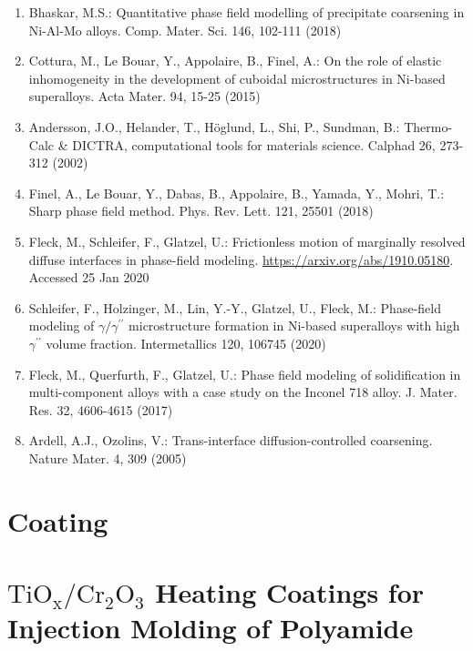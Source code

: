 \documentclass[10pt]{article}
\begin{document}
\begin{enumerate}
  \item Bhaskar, M.S.: Quantitative phase field modelling of precipitate coarsening in Ni-Al-Mo alloys. Comp. Mater. Sci. 146, 102-111 (2018)

  \item Cottura, M., Le Bouar, Y., Appolaire, B., Finel, A.: On the role of elastic inhomogeneity in the development of cuboidal microstructures in Ni-based superalloys. Acta Mater. 94, 15-25 (2015)

  \item Andersson, J.O., Helander, T., Höglund, L., Shi, P., Sundman, B.: Thermo-Calc \& DICTRA, computational tools for materials science. Calphad 26, 273-312 (2002)

  \item Finel, A., Le Bouar, Y., Dabas, B., Appolaire, B., Yamada, Y., Mohri, T.: Sharp phase field method. Phys. Rev. Lett. 121, 25501 (2018)

  \item Fleck, M., Schleifer, F., Glatzel, U.: Frictionless motion of marginally resolved diffuse interfaces in phase-field modeling. \href{https://arxiv.org/abs/1910.05180}{https://arxiv.org/abs/1910.05180}. Accessed 25 Jan 2020

  \item Schleifer, F., Holzinger, M., Lin, Y.-Y., Glatzel, U., Fleck, M.: Phase-field modeling of $\gamma / \gamma^{\prime \prime}$ microstructure formation in Ni-based superalloys with high $\gamma^{\prime \prime}$ volume fraction. Intermetallics 120, 106745 (2020)

  \item Fleck, M., Querfurth, F., Glatzel, U.: Phase field modeling of solidification in multi-component alloys with a case study on the Inconel 718 alloy. J. Mater. Res. 32, 4606-4615 (2017)

  \item Ardell, A.J., Ozolins, V.: Trans-interface diffusion-controlled coarsening. Nature Mater. 4, 309 (2005)

\end{enumerate}

\section*{Coating}
\section*{$\mathrm{TiO}_{\mathrm{x}} / \mathrm{Cr}_{2} \mathrm{O}_{3}$ Heating Coatings for Injection Molding of Polyamide }
\end{document}

